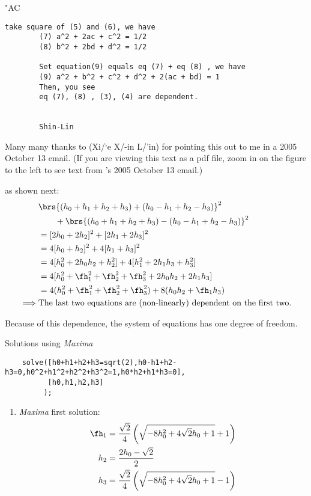 \begin{example}
\begin{dingautolist}{"AC}
{\begin{minipage}[t]{2\tw/16+1ex}
\begin{Verbatim}[frame=single, gobble=8, label={\footnotesize\rmfamily email}]
        take square of (5) and (6), we have
        (7) a^2 + 2ac + c^2 = 1/2
        (8) b^2 + 2bd + d^2 = 1/2

        Set equation(9) equals eq (7) + eq (8) , we have
        (9) a^2 + b^2 + c^2 + d^2 + 2(ac + bd) = 1
        Then, you see
        eq (7), (8) , (3), (4) are dependent.


        Shin-Lin
      \end{Verbatim}
    \end{minipage}
    \hfill
    \begin{minipage}[t]{13\tw/16-3ex}
      Many many thanks to
      \zht{\zhtXie\zhtXin\zhtLin} (Xi/`e X/-in L/'in) for pointing this out to me in a 2005 October 13 email.
      (If you are viewing this text as a pdf file,
       zoom in on the figure to the left to see text from \zht{\zhtXie\zhtXin\zhtLin}'s 2005 October 13 email.)
    \end{minipage}
  }
  as shown next:
  \begin{align*}
    &  \brs{(h_0+h_1+h_2+h_3)+(h_0-h_1+h_2-h_3)}^2
  \\&\qquad+\brs{(h_0+h_1+h_2+h_3)-(h_0-h_1+h_2-h_3)}^2
  \\&= [2h_0+2h_2]^2+[2h_1+2h_3]^2
  \\&= 4[h_0+h_2]^2+4[h_1+h_3]^2
  \\&= 4[h_0^2+2h_0h_2+h_2^2]+4[h_1^2+2h_1h_3+h_3^2]
  \\&= 4[h_0^2 +\fh_1^2 +\fh_2^2 +\fh_3^2 + 2h_0h_2 + 2h_1h_3]
  \\&= 4(h_0^2 +\fh_1^2 +\fh_2^2 +\fh_3^2) + 8(h_0h_2 +\fh_1h_3)
  \\ \implies & \text{The last two equations are (non-linearly) dependent on the first two.}
  \end{align*}

\item Because of this dependence, the system of equations has one degree of freedom.

\item Solutions using {\em Maxima}\\ %
  {\footnotesize
  \begin{verbatim}
    solve([h0+h1+h2+h3=sqrt(2),h0-h1+h2-h3=0,h0^2+h1^2+h2^2+h3^2=1,h0*h2+h1*h3=0],
          [h0,h1,h2,h3]
         );
  \end{verbatim}
  }
  \begin{enumerate}
    \item {\em Maxima} first solution:
      \begin{align*}
       \fh_1 &= \frac{\sqrt{2}}{4}\left(\sqrt{-8h_0^2+4\sqrt{2}h_0+1}+1\right)
      \\h_2 &= \frac{2h_0-\sqrt{2}}{2}
      \\h_3 &= \frac{\sqrt{2}}{4}\left(\sqrt{-8h_0^2+4\sqrt{2}h_0+1}-1\right)
      \end{align*}


\end{enumerate}
\end{dingautolist}
\end{example}
